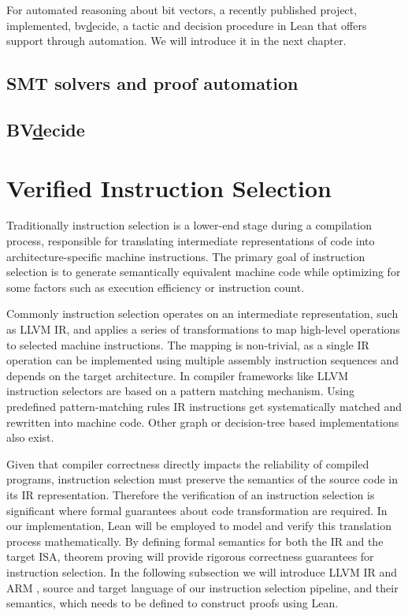 For automated reasoning about bit vectors, a recently published project, implemented, bv\underline decide, a tactic and decision procedure in Lean that offers support through automation.  We will introduce it in the next chapter. 


        \subsection{SMT solvers and proof automation}
		\subsection {BV\underline decide}
\section {Verified Instruction Selection} 
Traditionally instruction selection is a lower-end stage during a compilation process, responsible for translating intermediate representations of code into architecture-specific machine instructions. The primary goal of instruction selection is to generate semantically equivalent machine code while optimizing for some factors such as execution efficiency or instruction count.  

Commonly instruction selection operates on an intermediate representation, such as LLVM IR, and applies a series of transformations to map high-level operations to selected machine instructions. The mapping is non-trivial, as a single IR operation can be implemented using multiple assembly instruction sequences and depends on the target architecture. In compiler frameworks like LLVM instruction selectors are based on a pattern matching mechanism. Using predefined pattern-matching rules IR instructions get systematically matched and rewritten into machine code.  Other graph or decision-tree based implementations also exist.

Given that compiler correctness directly impacts the reliability of compiled programs, instruction selection must preserve the semantics of the source code in its IR representation. Therefore the verification of an instruction selection is significant where formal guarantees about code transformation are required. In our implementation, Lean will be employed to model and verify this translation process mathematically. By defining formal semantics for both the IR and the target ISA, theorem proving will provide rigorous correctness guarantees for instruction selection. 
In the following subsection we will introduce LLVM IR and ARM , source and target language of our instruction selection pipeline, and their semantics, which needs to be defined to construct proofs using Lean.

